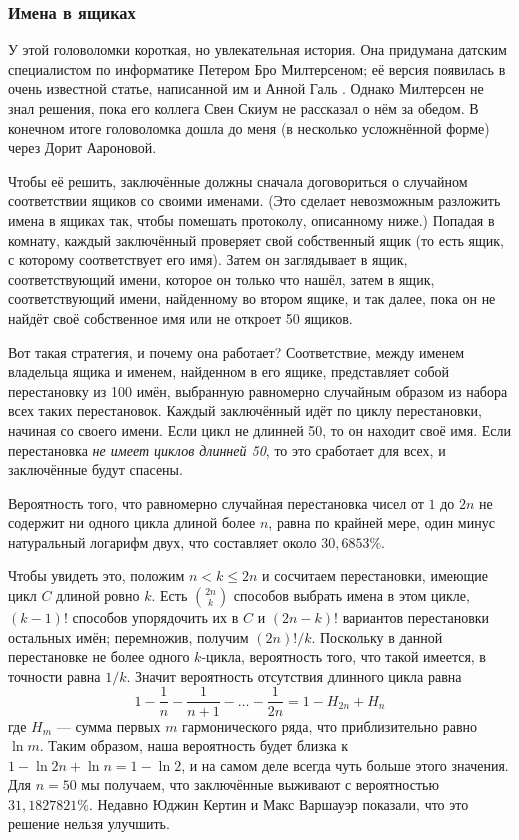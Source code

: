 \subsubsection*{Имена в ящиках}

У этой головоломки короткая, но увлекательная история.
Она придумана датским специалистом по информатике Петером Бро Милтерсеном;
её версия появилась в очень известной статье, написанной им и Анной Галь \cite{21}.
Однако Милтерсен не знал  решения, пока его коллега Свен Скиум не рассказал о нём за обедом.
В конечном итоге головоломка дошла до меня (в несколько усложнённой форме) через Дорит Аароновой.

Чтобы её решить, заключённые должны сначала договориться о случайном соответствии ящиков со своими именами.
(Это сделает невозможным разложить имена в ящиках так, чтобы помешать протоколу, описанному ниже.)
Попадая в комнату, каждый заключённый проверяет свой собственный ящик (то есть ящик, с которому соответствует его имя).
Затем он заглядывает в ящик, соответствующий имени, которое он только что нашёл,
затем в ящик, соответствующий имени, найденному во втором ящике, и так далее, пока он не найдёт своё собственное имя или не откроет 50 ящиков.

Вот такая стратегия, и почему она работает?
Соответствие, между именем владельца ящика и именем, найденном в его ящике, представляет собой перестановку из 100 имён, выбранную равномерно случайным образом из набора всех таких перестановок.
Каждый заключённый идёт по циклу перестановки, начиная со своего имени.
Если цикл не длинней 50, то он находит своё имя.
Если перестановка \emph{не имеет циклов длинней 50}, то это сработает для всех, и заключённые будут спасены.

Вероятность того, что равномерно случайная перестановка чисел от $1$ до $2n$ не содержит ни одного цикла длиной более $n$, равна по крайней мере, один минус натуральный логарифм двух, что составляет около $30{,}6853\%$.

Чтобы увидеть это, положим $n < k \le 2n$ и сосчитаем перестановки, имеющие цикл $C$ длиной ровно $k$.
Есть $\binom{2n}k$ способов выбрать имена в этом цикле, $(k - 1)!$ способов упорядочить их в $C$
и $(2n - k)!$ вариантов перестановки остальных имён;
перемножив, получим $(2n)!/k$.
Поскольку в данной перестановке не более одного $k$-цикла, вероятность того, что такой имеется, в точности равна $1/k$.
Значит вероятность отсутствия длинного цикла равна
\[1-\frac{1}{n}-\frac{1}{n+1}-\dots-\frac{1}{2n}=1-H_{2n}+H_n\]
где $H_m$ --- сумма первых $m$ гармонического ряда, что приблизительно равно $\ln m$.
Таким образом, наша вероятность будет близка к $1 - \ln 2n + \ln n = 1 - \ln 2$, и на самом деле всегда чуть больше этого значения.
Для $n = 50$ мы получаем, что заключённые выживают с вероятностью $31,1827821\%$.
Недавно Юджин Кертин и Макс Варшауэр \cite{13} показали, что это решение нельзя улучшить.

